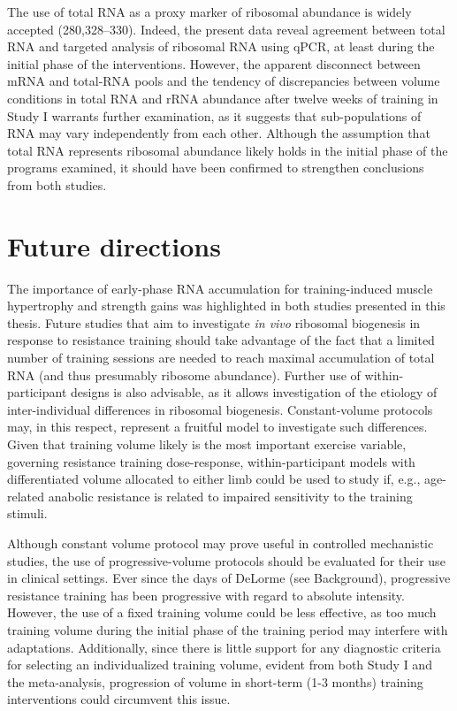 \documentclass[twoside,10pt]{gihclass} %
\begin{document}
The use of total RNA as a proxy marker of ribosomal abundance is widely accepted
(280,328--330).
Indeed, the present data reveal agreement between total RNA and targeted analysis of ribosomal RNA using qPCR, at least during the initial phase of the interventions. However, the apparent disconnect between mRNA and total-RNA pools and the tendency of discrepancies between volume conditions in total RNA and rRNA abundance after twelve weeks of training in Study I warrants further examination, as it suggests that sub-populations of RNA may vary independently from each other. Although the assumption that total RNA represents ribosomal abundance likely holds in the initial phase of the programs examined, it should have been confirmed to strengthen conclusions from both studies.

\hypertarget{future-directions}{%
\section{Future directions}\label{future-directions}}

The importance of early-phase RNA accumulation for training-induced muscle hypertrophy and strength gains was highlighted in both studies presented in this thesis. Future studies that aim to investigate \emph{in vivo} ribosomal biogenesis in response to resistance training should take advantage of the fact that a limited number of training sessions are needed to reach maximal accumulation of total RNA (and thus presumably ribosome abundance). Further use of within-participant designs is also advisable, as it allows investigation of the etiology of inter-individual differences in ribosomal biogenesis. Constant-volume protocols may, in this respect, represent a fruitful model to investigate such differences. Given that training volume likely is the most important exercise variable, governing resistance training dose-response, within-participant models with differentiated volume allocated to either limb could be used to study if, e.g., age-related anabolic resistance is related to impaired sensitivity to the training stimuli.

Although constant volume protocol may prove useful in controlled mechanistic studies, the use of progressive-volume protocols should be evaluated for their use in clinical settings. Ever since the days of DeLorme (see Background), progressive resistance training has been progressive with regard to absolute intensity. However, the use of a fixed training volume could be less effective, as too much training volume during the initial phase of the training period may interfere with adaptations. Additionally, since there is little support for any diagnostic criteria for selecting an individualized training volume, evident from both Study I and the meta-analysis, progression of volume in short-term (1-3 months) training interventions could circumvent this issue.
\end{document}
